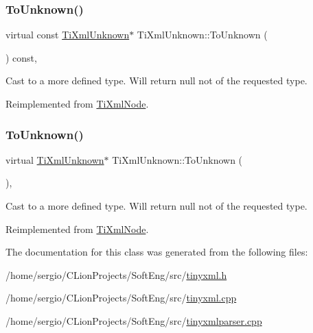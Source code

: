 \subsubsection{\texorpdfstring{To\+Unknown()}{ToUnknown()}\hspace{0.1cm}{\footnotesize\ttfamily [1/2]}}
{\footnotesize\ttfamily virtual const \hyperlink{class_ti_xml_unknown}{Ti\+Xml\+Unknown}$\ast$ Ti\+Xml\+Unknown\+::\+To\+Unknown (\begin{DoxyParamCaption}{ }\end{DoxyParamCaption}) const\hspace{0.3cm}{\ttfamily [inline]}, {\ttfamily [virtual]}}



Cast to a more defined type. Will return null not of the requested type. 



Reimplemented from \hyperlink{class_ti_xml_node_ab4f2e6ce87d36c1b9b7de2529128a460}{Ti\+Xml\+Node}.

\mbox{\label{class_ti_xml_unknown_a67c9fd22940e8c47f706a72cdd2e332c}} 
\subsubsection{\texorpdfstring{To\+Unknown()}{ToUnknown()}\hspace{0.1cm}{\footnotesize\ttfamily [2/2]}}
{\footnotesize\ttfamily virtual \hyperlink{class_ti_xml_unknown}{Ti\+Xml\+Unknown}$\ast$ Ti\+Xml\+Unknown\+::\+To\+Unknown (\begin{DoxyParamCaption}{ }\end{DoxyParamCaption})\hspace{0.3cm}{\ttfamily [inline]}, {\ttfamily [virtual]}}



Cast to a more defined type. Will return null not of the requested type. 



Reimplemented from \hyperlink{class_ti_xml_node_a06de5af852668c7e4af0d09c205f0b0d}{Ti\+Xml\+Node}.



The documentation for this class was generated from the following files\+:\begin{DoxyCompactItemize}
\item 
/home/sergio/\+C\+Lion\+Projects/\+Soft\+Eng/src/\hyperlink{tinyxml_8h}{tinyxml.\+h}\item 
/home/sergio/\+C\+Lion\+Projects/\+Soft\+Eng/src/\hyperlink{tinyxml_8cpp}{tinyxml.\+cpp}\item 
/home/sergio/\+C\+Lion\+Projects/\+Soft\+Eng/src/\hyperlink{tinyxmlparser_8cpp}{tinyxmlparser.\+cpp}\end{DoxyCompactItemize}
